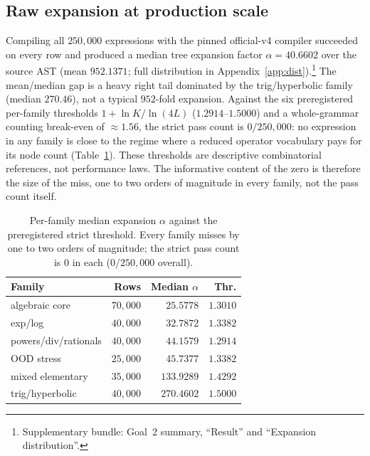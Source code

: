 \documentclass[11pt]{article}
\newcommand{\anchor}[1]{\footnote{#1}}
\begin{document}
\subsection{Raw expansion at production scale}
Compiling all $250{,}000$ expressions with the pinned official-v4 compiler
succeeded on every row and produced a median tree expansion factor
$\alpha=40.6602$ over the source AST (mean $952.1371$; full distribution in
Appendix~\ref{app:dist}).\anchor{Supplementary bundle: Goal~2 summary,
``Result'' and ``Expansion distribution''.} The
mean/median gap is a heavy right tail dominated by the trig/hyperbolic family
(median $270.46$), not a typical $952$-fold expansion. Against the six
preregistered per-family thresholds $1+\ln K/\ln(4L)$ ($1.2914$--$1.5000$) and a
whole-grammar counting break-even of $\approx\!1.56$, the strict pass count is
$0/250{,}000$: no expression in any family is close to the regime where a reduced
operator vocabulary pays for its node count (Table~\ref{tab:families}). These
thresholds are descriptive combinatorial references, not performance laws. The
informative content of the zero is therefore the size of the miss, one to two
orders of magnitude in every family, not the pass count itself.

\begin{table}[t]
\centering
\small
\renewcommand{\arraystretch}{1.1}
\begin{tabular}{@{}lrrr@{}}
\toprule
\textbf{Family} & \textbf{Rows} & \textbf{Median} $\alpha$ & \textbf{Thr.} \\
\midrule
algebraic core             & $70{,}000$ & $25.5778$  & $1.3010$ \\
exp/log                    & $40{,}000$ & $32.7872$  & $1.3382$ \\
powers/div/rationals       & $40{,}000$ & $44.1579$  & $1.2914$ \\
OOD stress                 & $25{,}000$ & $45.7377$  & $1.3382$ \\
mixed elementary           & $35{,}000$ & $133.9289$ & $1.4292$ \\
trig/hyperbolic            & $40{,}000$ & $270.4602$ & $1.5000$ \\
\bottomrule
\end{tabular}
\caption{Per-family median expansion $\alpha$ against the preregistered strict
threshold. Every family misses by one to two orders of magnitude; the strict pass
count is $0$ in each ($0/250{,}000$ overall).}
\label{tab:families}
\end{table}
\end{document}
